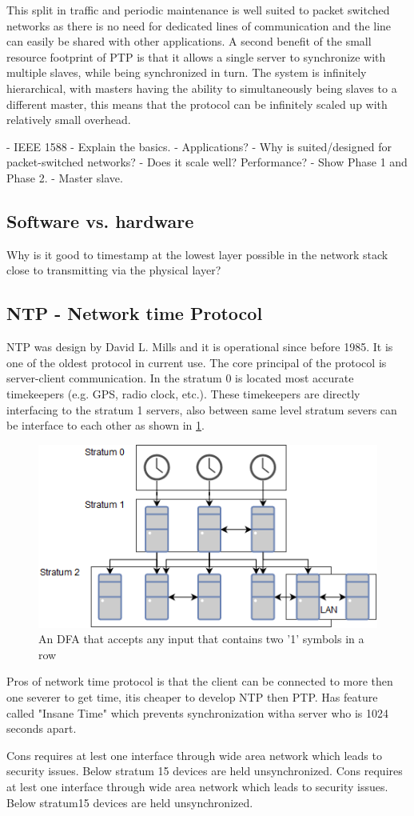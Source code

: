 This split in traffic and periodic maintenance is well suited to packet switched networks as there is no need for dedicated lines of communication and the line can easily be shared with other applications. A second benefit of the small resource footprint of PTP is that it allows a single server to synchronize with multiple slaves, while being synchronized in turn. The system is infinitely hierarchical, with masters having the ability to simultaneously being slaves to a different master, this means that the protocol can be infinitely scaled up with relatively small overhead.



- IEEE 1588
- Explain the basics. 
- Applications?
- Why is suited/designed for packet-switched networks?
- Does it scale well? Performance?
- Show Phase 1 and Phase 2.
- Master slave.

\subsection{Software vs. hardware}

Why is it good to timestamp at the lowest layer possible in the network stack close to transmitting via the physical layer?
\subsection{NTP - Network time Protocol}

NTP was design by David L. Mills and it is operational since before 1985. It is one of the oldest protocol in
current use. The core principal of the protocol is server-client communication. In the stratum 0 is located
most accurate timekeepers (e.g. GPS, radio clock, etc.). These timekeepers are directly interfacing to the
stratum 1 servers, also between same level stratum severs can be interface to each other as shown in \ref{fig:NTP}.

\begin{figure}[h!]\label{}
	\centering
	\includegraphics[scale=0.4]{synchronization/fig/NTP.png}
	\caption{An DFA that accepts any input that contains two '1' symbols in a row}
	\label{fig:NTP}
\end{figure}
Pros of network time protocol is that the client can be connected to more then one severer to get time, itis cheaper to develop NTP then PTP. Has feature called "Insane Time" which prevents synchronization witha server who is 1024 seconds apart.


Cons requires at lest one interface through wide area network which leads to security issues. Below stratum
15 devices are held unsynchronized.
Cons requires at lest one interface through wide area network which leads to security issues. Below stratum15 devices are held unsynchronized.
